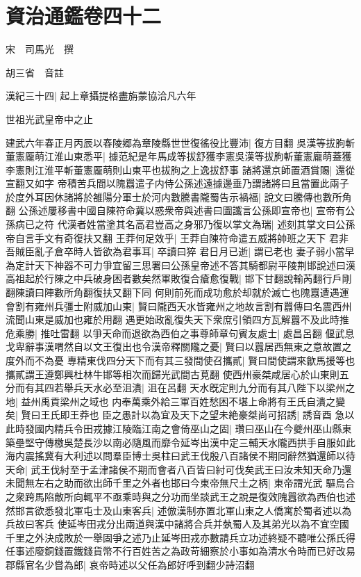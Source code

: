 \section{資治通鑑卷四十二}
宋　司馬光　撰

胡三省　音註

漢紀三十四|{
	起上章攝提格盡旃蒙協洽凡六年}


世祖光武皇帝中之止

建武六年春正月丙辰以舂陵郷為章陵縣世世復徭役比豐沛|{
	復方目翻}
吳漢等拔胊斬董憲龎萌江淮山東悉平|{
	據范紀是年馬成等拔舒獲李憲吳漢等拔朐斬董憲龐萌蓋獲李憲則江淮平斬董憲龎萌則山東平也拔胊之上逸拔舒事}
諸將還京師置酒賞賜|{
	還從宣翻又如字}
帝積苦兵間以隗囂遣子内侍公孫述遠據邊垂乃謂諸將曰且當置此兩子於度外耳因休諸將於雒陽分軍士於河内數騰書隴蜀告示禍福|{
	說文曰騰傳也數所角翻}
公孫述屢移書中國自陳符命冀以惑衆帝與述書曰圖讖言公孫即宣帝也|{
	宣帝有公孫病已之符}
代漢者姓當塗其名高君豈高之身邪乃復以掌文為瑞|{
	述刻其掌文曰公孫帝自言手文有奇復扶又翻}
王莽何足效乎|{
	王莽自陳符命遣五威將帥班之天下}
君非吾賊臣亂子倉卒時人皆欲為君事耳|{
	卒讀曰猝}
君日月已逝|{
	謂已老也}
妻子弱小當早為定計天下神器不可力爭宜留三思署曰公孫皇帝述不答其騎都尉平陵荆邯說述曰漢高祖起於行陳之中兵破身困者數矣然軍敗復合瘡愈復戰|{
	邯下甘翻說輸芮翻行戶剛翻陳讀曰陣數所角翻復扶又翻下同}
何則前死而成功愈於却就於滅亡也隗囂遭遇運會割有雍州兵彊士附威加山東|{
	賢曰隴西天水皆雍州之地故言割有囂傳曰名震西州流聞山東是威加也雍於用翻}
遇更始政亂復失天下衆庶引領四方瓦解囂不及此時推危乘勝|{
	推吐雷翻}
以爭天命而退欲為西伯之事尊師章句賓友處士|{
	處昌呂翻}
偃武息戈卑辭事漢喟然自以文王復出也令漢帝釋關隴之憂|{
	賢曰以囂居西無東之意故置之度外而不為憂}
專精東伐四分天下而有其三發間使召攜貳|{
	賢曰間使謂來歙馬援等也攜貳謂王遵鄭興杜林牛邯等相次而歸光武間古莧翻}
使西州豪桀咸居心於山東則五分而有其四若舉兵天水必至沮潰|{
	沮在呂翻}
天水旣定則九分而有其八陛下以梁州之地|{
	益州禹貢梁州之域也}
内奉萬乘外給三軍百姓愁困不堪上命將有王氏自潰之變矣|{
	賢曰王氏即王莽也}
臣之愚計以為宜及天下之望未絶豪桀尚可招誘|{
	誘音酉}
急以此時發國内精兵令田戎據江陵臨江南之會倚巫山之固|{
	瓚曰巫山在今夔州巫山縣東}
築壘堅守傳檄吳楚長沙以南必隨風而靡令延岑出漢中定三輔天水隴西拱手自服如此海内震搖冀有大利述以問羣臣博士吳柱曰武王伐殷八百諸侯不期同辭然猶還師以待天命|{
	武王伐紂至于孟津諸侯不期而會者八百皆曰紂可伐矣武王曰汝未知天命乃還}
未聞無左右之助而欲出師千里之外者也邯曰今東帝無尺土之柄|{
	東帝謂光武}
驅烏合之衆跨馬陷敵所向輒平不亟乘時與之分功而坐談武王之說是復效隗囂欲為西伯也述然邯言欲悉發北軍屯士及山東客兵|{
	述倣漢制亦置北軍山東之人僑寓於蜀者述以為兵故曰客兵}
使延岑田戎分出兩道與漢中諸將合兵并埶蜀人及其弟光以為不宜空國千里之外決成敗於一舉固爭之述乃止延岑田戎亦數請兵立功述終疑不聽唯公孫氏得任事述廢銅錢置鐵錢貨幣不行百姓苦之為政苛細察於小事如為清水令時而已好改易郡縣官名少嘗為郎|{
	哀帝時述以父任為郎好呼到翻少詩沼翻}
